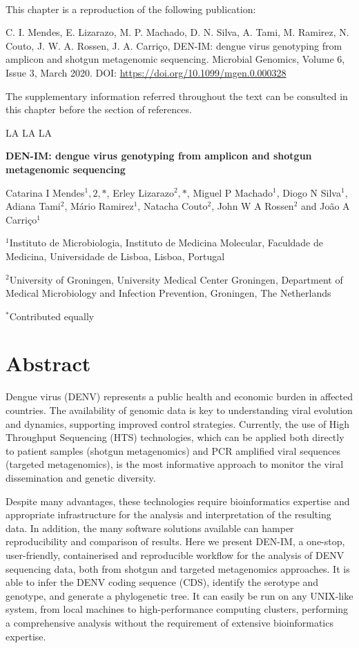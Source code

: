 \mbox{}\\
\vspace{8cm}

This chapter is a reproduction of the following publication:

C. I. Mendes, E. Lizarazo, M. P. Machado, D. N. Silva, A. Tami, M. Ramirez, N. Couto, J. W. A. Rossen, J. A. Carriço, DEN-IM: dengue virus genotyping from amplicon and shotgun metagenomic sequencing. Microbial Genomics, Volume 6, Issue 3, March 2020. DOI: \url{https://doi.org/10.1099/mgen.0.000328}

The supplementary information referred throughout the text can be consulted in this chapter before the section of references. 

LA LA LA 

\cleardoublepage 

\begin{center}
\large
\textbf{DEN-IM: dengue virus genotyping from amplicon and shotgun metagenomic sequencing}
\end{center}

Catarina I Mendes$^1,2,*$, 
Erley Lizarazo$^2,*$,
Miguel P Machado$^1$, 
Diogo N Silva$^1$,
Adiana Tami$^2$,
Mário Ramirez$^1$, 
Natacha Couto$^2$, 
John W A Rossen$^2$ and João A Carriço$^1$


$^1$Instituto de Microbiologia, Instituto de Medicina Molecular, Faculdade de Medicina, Universidade de Lisboa, Lisboa, Portugal 

$^2$University of Groningen, University Medical Center Groningen, Department of Medical Microbiology and Infection Prevention, Groningen, The Netherlands

$^*$Contributed equally

\section{Abstract}

Dengue virus (DENV) represents a public health and economic burden in affected countries. The availability of genomic data is key to understanding viral evolution and dynamics, supporting improved control strategies. Currently, the use of High Throughput Sequencing (HTS) technologies, which can be applied both directly to patient samples (shotgun metagenomics) and PCR amplified viral sequences (targeted metagenomics), is the most informative approach to monitor the viral dissemination and genetic diversity.

Despite many advantages, these technologies require bioinformatics expertise and appropriate infrastructure for the analysis and interpretation of the resulting data. In addition, the many software solutions available can hamper reproducibility and comparison of results.
Here we present DEN-IM, a one-stop, user-friendly, containerised and reproducible workflow for the analysis of DENV sequencing data, both from shotgun and targeted metagenomics approaches. It is able to infer the DENV coding sequence (CDS), identify the serotype and genotype, and generate a phylogenetic tree. It can easily be run on any UNIX-like system, from local machines to high-performance computing clusters, performing a comprehensive analysis without the requirement of extensive bioinformatics expertise.

